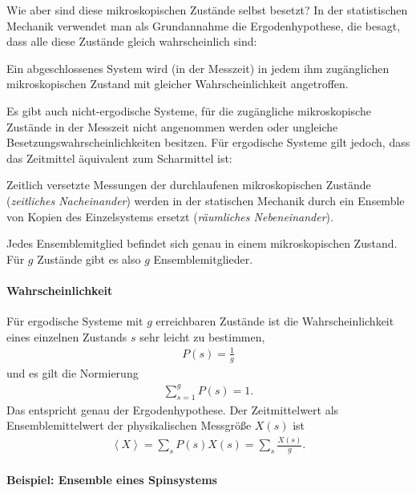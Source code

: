 Wie aber sind diese mikroskopischen Zustände selbst besetzt? In der statistischen Mechanik verwendet man als Grundannahme die Ergodenhypothese, die besagt, dass alle diese Zustände gleich wahrscheinlich sind:
\begin{postulate}[Erdogenhypothese]
    Ein abgeschlossenes System wird (in der Messzeit) in jedem ihm zugänglichen mikroskopischen Zustand mit gleicher Wahrscheinlichkeit angetroffen.
\end{postulate}

Es gibt auch nicht-ergodische Systeme, für die zugängliche mikroskopische Zustände in der Messzeit nicht angenommen werden oder ungleiche Besetzungswahrscheinlichkeiten besitzen.
Für ergodische Systeme gilt jedoch, dass das Zeitmittel äquivalent zum Scharmittel ist:
\begin{formal}
    Zeitlich versetzte Messungen der durchlaufenen mikroskopischen Zustände (\emph{zeitliches Nacheinander}) werden in der statischen Mechanik durch ein Ensemble von Kopien des Einzelsystems ersetzt (\emph{räumliches Nebeneinander}).

    Jedes Ensemblemitglied befindet sich genau in einem mikroskopischen Zustand. Für $g$ Zustände gibt es also $g$ Ensemblemitglieder.
\end{formal}


\paragraph*{Wahrscheinlichkeit}

Für ergodische Systeme mit $g$ erreichbaren Zustände ist die Wahrscheinlichkeit eines einzelnen Zustands $s$ sehr leicht zu bestimmen,
\begin{align*}
    P(s) = \frac{1}{g}
\end{align*}
und es gilt die Normierung
\begin{align*}
    \sum_{s=1}^g P(s) = 1.
\end{align*}
Das entspricht genau der Ergodenhypothese.
Der Zeitmittelwert als Ensemblemittelwert der physikalischen Messgröße $X(s)$ ist
\begin{align*}
    \left\langle X\right\rangle = \sum_s P(s)X(s) = \sum_s \frac{X(s)}{g}.
\end{align*}

\paragraph*{Beispiel: Ensemble eines Spinsystems}

